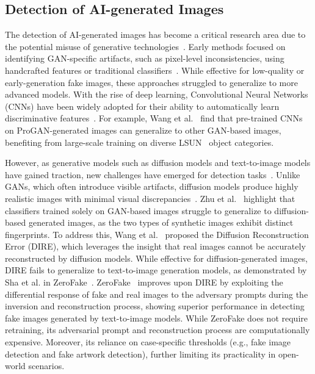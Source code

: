 \subsection{Detection of AI-generated Images}
The detection of AI-generated images has become a critical research area due to the potential misuse of generative technologies~\cite{yan2023deepfakebench}. 
Early methods focused on identifying GAN-specific artifacts, such as pixel-level inconsistencies, using handcrafted features or traditional classifiers~\cite{marra2019gans,li2020face,mccloskey2019detecting}. While effective for low-quality or early-generation fake images, these approaches struggled to generalize to more advanced models. With the rise of deep learning, Convolutional Neural Networks (CNNs) have been widely adopted for their ability to automatically learn discriminative features~\cite{wang2024deepfake,rossler2019faceforensics++}. For example, Wang et al.~\cite{wang2020cnn} find that pre-trained CNNs on ProGAN-generated images can generalize to other GAN-based images, benefiting from large-scale training on diverse LSUN~\cite{yu2015lsun} object categories.

However, as generative models such as diffusion models and text-to-image models have gained traction, new challenges have emerged for detection tasks~\cite{stein2024exposing}. Unlike GANs, which often introduce visible artifacts, diffusion models produce highly realistic images with minimal visual discrepancies~\cite{corvi2023intriguing}. Zhu et al.~\cite{zhu2024genimage} highlight that classifiers trained solely on GAN-based images struggle to generalize to diffusion-based generated images, as the two types of synthetic images exhibit distinct fingerprints.
To address this, Wang et al.~\cite{wang2023dire} proposed the Diffusion Reconstruction Error (DIRE), which leverages the insight that real images cannot be accurately reconstructed by diffusion models. While effective for diffusion-generated images, DIRE fails to generalize to text-to-image generation models, as demonstrated by Sha et al. in ZeroFake~\cite{sha2024zerofake}. ZeroFake~\cite{sha2024zerofake} improves upon DIRE by exploiting the differential response of fake and real images to the adversary prompts during the inversion and reconstruction process, showing superior performance in detecting fake images generated by text-to-image models. While ZeroFake does not require retraining, its adversarial prompt and reconstruction process are computationally expensive. Moreover, its reliance on case-specific thresholds (e.g., fake image detection and fake artwork detection), further limiting its practicality in open-world scenarios.


